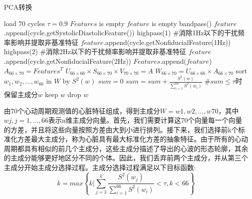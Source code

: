 \begin{algorithm}[!ht]
        \caption{PCA转换}
        \begin{algorithmic}[1] %
        \State load  70  cycles \hspace{8em}\space\space{}
        \State $\tau =0.9$
        \State $Features$ is empty
            \State $feature$ is empty
            \State bandpass() \hspace{8em} \space {}
            \State $feature$.append(cycle.getSystolicDiastolicFeature())
            \State highpass(1) \hspace{8em} {\#消除1Hz以下的干扰频率影响并提取非基准特征}
            \State $feature$.append(cycle.getNonfiducialFeature(1Hz))
            \State highpass(2) \hspace{8em} {\#消除2Hz以下的干扰频率影响并提取非基准特征}
            \State $feature$.append(cycle.getNonfiducialFeature(2Hz))
            \State $Features$.append($feature$)
        \EndFor
        \State $A_{66\times 70}=Features^{T}$
        \State $U_{66\times 66} \times S_{66\times 70} \times V_{70\times 70}=A$ 
        \State $W_{66\times 70}=U_{66\times 66}\times A_{66\times 70}$
        \State sort $w_1,w_2,\dots,w_{66}$ in $W$ by $S^2(w)$ 
        \State $sum=0$
        \State $sum=sum+\frac{S^2(w)}{\sum_{i=1}^{66}{S^2(w_i)}}$
         \hspace{6em} {\#$sum\leq\tau$时保留主成分$w$}
        \State keep $w$ 
        \Else \hspace{11em} \space{}
        \State drop $w$ 
        \EndIf
        \EndFor
        \end{algorithmic}
    \end{algorithm}
\newpage
\par
{
由70个心动周期观测值的心脏特征组成，得到主成分$W={w1,w2,\dots ,w70}$，其中$wj,j=1,\dots ,66$表示n维主成分向量。首先，我们需要计算这70个向量每一个向量的方差，并且将这些向量按照方差由大到小进行排列。接下来，我们选择前k个标准化方差最大主成分，称为心脏具有最大标准化方差的抽象特征。由于所有的心动周期都具有相似的前几个主成分，这些主成分描述了导出的心波的形态轮廓，其余的主成分能够更好地区分不同的个体。因此，我们丢弃前两个主成分，并从第三个主成分开始主成分选择过程。主成分选择过程满足以下目标函数:
}
\begin{equation}
    k=max\left\{ k|\sum_{j=3}^{k}{\frac{S^2(w_j)}{\sum_{i=1}^{66}{S^2(w_i)}}}<\tau,k<66\right\}
\end{equation}
